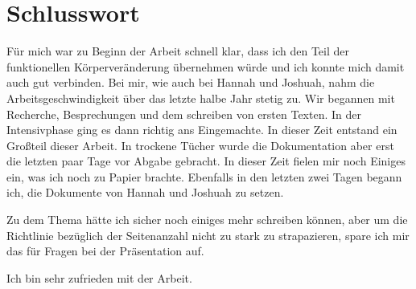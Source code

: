 \section{Schlusswort}
Für mich war zu Beginn der Arbeit schnell klar, dass ich den Teil der funktionellen Körperveränderung
übernehmen würde und ich konnte mich damit auch gut verbinden. Bei mir, wie auch bei Hannah und
Joshuah, nahm die Arbeitsgeschwindigkeit über das letzte halbe Jahr stetig zu. Wir begannen mit
Recherche, Besprechungen und dem schreiben von ersten Texten. In der Intensivphase ging es dann
richtig ans Eingemachte. In dieser Zeit entstand ein Großteil dieser Arbeit. In trockene Tücher wurde
die Dokumentation aber erst die letzten paar Tage vor Abgabe gebracht. In dieser Zeit fielen mir noch
Einiges ein, was ich noch zu Papier brachte. Ebenfalls in den letzten zwei Tagen begann ich,
die Dokumente von Hannah und Joshuah zu setzen.

Zu dem Thema hätte ich sicher noch einiges mehr schreiben können, aber um die Richtlinie bezüglich
der Seitenanzahl nicht zu stark zu strapazieren, spare ich mir das für Fragen bei der Präsentation
auf.

Ich bin sehr zufrieden mit der Arbeit.
